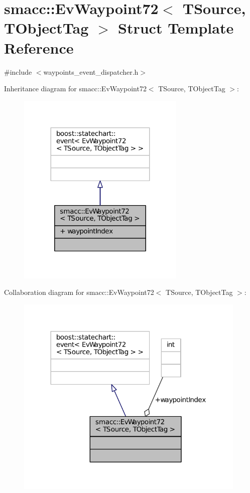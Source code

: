 \hypertarget{structsmacc_1_1EvWaypoint72}{}\section{smacc\+:\+:Ev\+Waypoint72$<$ T\+Source, T\+Object\+Tag $>$ Struct Template Reference}
\label{structsmacc_1_1EvWaypoint72}


{\ttfamily \#include $<$waypoints\+\_\+event\+\_\+dispatcher.\+h$>$}



Inheritance diagram for smacc\+:\+:Ev\+Waypoint72$<$ T\+Source, T\+Object\+Tag $>$\+:
\nopagebreak
\begin{figure}[H]
\begin{center}
\leavevmode
\includegraphics[width=227pt]{structsmacc_1_1EvWaypoint72__inherit__graph}
\end{center}
\end{figure}


Collaboration diagram for smacc\+:\+:Ev\+Waypoint72$<$ T\+Source, T\+Object\+Tag $>$\+:
\nopagebreak
\begin{figure}[H]
\begin{center}
\leavevmode
\includegraphics[width=312pt]{structsmacc_1_1EvWaypoint72__coll__graph}
\end{center}
\end{figure}
